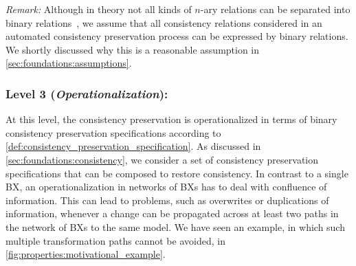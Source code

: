 \noindent\textit{Remark:} 
Although in theory not all kinds of $n$-ary relations can be separated into binary relations~\cite{stevens2017a}, we assume that all consistency relations considered in an automated consistency preservation process can be expressed by binary relations.
We shortly discussed why this is a reasonable assumption in \autoref{sec:foundations:assumptions}.

\subsubsection*{Level 3 (\emph{Operationalization}):}
At this level, the consistency preservation is operationalized in terms of binary consistency preservation specifications according to \autoref{def:consistency_preservation_specification}. %
As discussed in \autoref{sec:foundations:consistency}, we consider a set of consistency preservation specifications that can be composed to restore consistency.
In contrast to a single \ac{BX}, an operationalization in %
networks of \acp{BX} has to deal with confluence of information.
This can lead to problems, such as overwrites or duplications of information, whenever a change can be propagated across at least two paths in the network of \acp{BX} to the same model.
We have seen an example, in which such multiple transformation paths cannot be avoided, in \autoref{fig:properties:motivational_example}.

